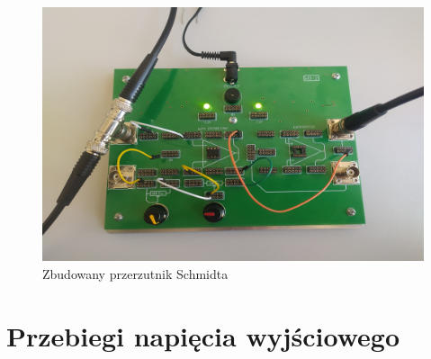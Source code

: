 \begin{itemize}
\begin{figure}[H]
            \includegraphics[scale=0.23]{img/phone/1651502036813_scaled.png}
            \caption{Zbudowany przerzutnik Schmidta}
            \label{fig:przerzutnik_schmidta}
        \end{figure}
\end{itemize}

\pagebreak

\section{Przebiegi napięcia wyjściowego}

